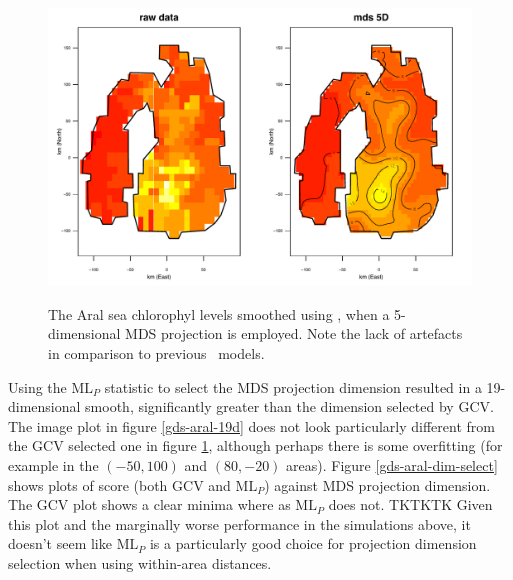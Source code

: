 \begin{figure}
\centering
\includegraphics[width=6in]{mds/figs/aral-5d-duchon.pdf} \\
\caption{The Aral sea chlorophyl levels smoothed using \mdsds, when a 5-dimensional MDS projection is employed. Note the lack of artefacts in comparison to previous \mdsap\ models.}
\label{mds-aral-5d-duchon}
\end{figure}

Using the $\text{ML}_P$ statistic to select the MDS projection dimension resulted in a 19-dimensional smooth, significantly greater than the dimension selected by GCV. The image plot in figure \ref{gds-aral-19d} does not look particularly different from the GCV selected one in figure \ref{mds-aral-5d-duchon}, although perhaps there is some overfitting (for example in the $(-50,100)$ and $(80,-20)$ areas). Figure \ref{gds-aral-dim-select} shows plots of score (both GCV and $\text{ML}_P$) against MDS projection dimension. The GCV plot shows a clear minima where as $\text{ML}_P$ does not. TKTKTK Given this plot and the marginally worse performance in the simulations above, it doesn't seem like $\text{ML}_P$ is a particularly good choice for projection dimension selection when using within-area distances.

